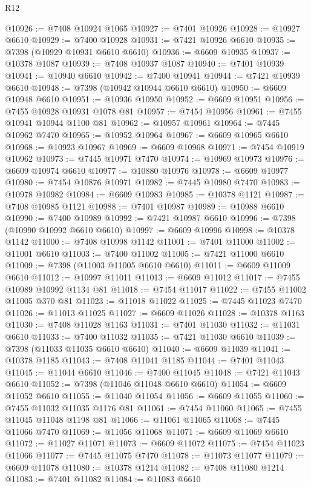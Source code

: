 \begin{lexlean}{R12}
\begin{coremodule}
@10926 := @7408 @10924 @1065
@10927 := @7401 @10926
@10928 := @10927 @6610
@10929 := @7400 @10928
@10931 := @7421 @10926 @6610
@10935 := @7398 (@10929 @10931 @6610 @6610)
@10936 := @6609 @10935
@10937 := @10378 @1087
@10939 := @7408 @10937 @1087
@10940 := @7401 @10939
@10941 := @10940 @6610
@10942 := @7400 @10941
@10944 := @7421 @10939 @6610
@10948 := @7398 (@10942 @10944 @6610 @6610)
@10950 := @6609 @10948 @6610
@10951 := @10936 @10950
@10952 := @6609 @10951
@10956 := @7455 @10928 @10931 @1078 @81
@10957 := @7454 @10956
@10961 := @7455 @10941 @10944 @1100 @81
@10962 := @10957 @10961
@10964 := @7445 @10962 @7470
@10965 := @10952 @10964
@10967 := @6609 @10965 @6610
@10968 := @10923 @10967
@10969 := @6609 @10968
@10971 := @7454 @10919 @10962
@10973 := @7445 @10971 @7470
@10974 := @10969 @10973
@10976 := @6609 @10974 @6610
@10977 := @10880 @10976
@10978 := @6609 @10977
@10980 := @7454 @10876 @10971
@10982 := @7445 @10980 @7470
@10983 := @10978 @10982
@10984 := @6609 @10983
@10985 := @10378 @1121
@10987 := @7408 @10985 @1121
@10988 := @7401 @10987
@10989 := @10988 @6610
@10990 := @7400 @10989
@10992 := @7421 @10987 @6610
@10996 := @7398 (@10990 @10992 @6610 @6610)
@10997 := @6609 @10996
@10998 := @10378 @1142
@11000 := @7408 @10998 @1142
@11001 := @7401 @11000
@11002 := @11001 @6610
@11003 := @7400 @11002
@11005 := @7421 @11000 @6610
@11009 := @7398 (@11003 @11005 @6610 @6610)
@11011 := @6609 @11009 @6610
@11012 := @10997 @11011
@11013 := @6609 @11012
@11017 := @7455 @10989 @10992 @1134 @81
@11018 := @7454 @11017
@11022 := @7455 @11002 @11005 @370 @81
@11023 := @11018 @11022
@11025 := @7445 @11023 @7470
@11026 := @11013 @11025
@11027 := @6609 @11026
@11028 := @10378 @1163
@11030 := @7408 @11028 @1163
@11031 := @7401 @11030
@11032 := @11031 @6610
@11033 := @7400 @11032
@11035 := @7421 @11030 @6610
@11039 := @7398 (@11033 @11035 @6610 @6610)
@11040 := @6609 @11039
@11041 := @10378 @1185
@11043 := @7408 @11041 @1185
@11044 := @7401 @11043
@11045 := @11044 @6610
@11046 := @7400 @11045
@11048 := @7421 @11043 @6610
@11052 := @7398 (@11046 @11048 @6610 @6610)
@11054 := @6609 @11052 @6610
@11055 := @11040 @11054
@11056 := @6609 @11055
@11060 := @7455 @11032 @11035 @1176 @81
@11061 := @7454 @11060
@11065 := @7455 @11045 @11048 @1198 @81
@11066 := @11061 @11065
@11068 := @7445 @11066 @7470
@11069 := @11056 @11068
@11071 := @6609 @11069 @6610
@11072 := @11027 @11071
@11073 := @6609 @11072
@11075 := @7454 @11023 @11066
@11077 := @7445 @11075 @7470
@11078 := @11073 @11077
@11079 := @6609 @11078
@11080 := @10378 @1214
@11082 := @7408 @11080 @1214
@11083 := @7401 @11082
@11084 := @11083 @6610

\end{coremodule}
\end{lexlean}
